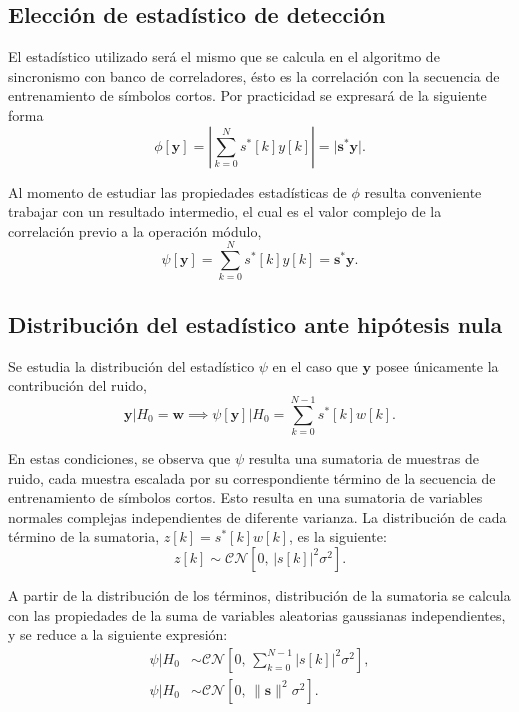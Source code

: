 \subsection{Elección de estadístico de detección}
\label{Ss:hipotesis-estadistico}


El estadístico utilizado será el mismo que se calcula en el algoritmo de sincronismo con banco de correladores, ésto es la correlación con la secuencia de entrenamiento de símbolos cortos. Por practicidad se expresará de la siguiente forma
\begin{equation}
    \phi[\mathbf{y}] = \left\lvert\sum_{k=0}^N s^\ast[k]y[k]\right\rvert = \lvert \mathbf{s}^\ast\mathbf{y}\rvert.
\end{equation}

Al momento de estudiar las propiedades estadísticas de $\phi$ resulta conveniente trabajar con un resultado intermedio, el cual es el valor complejo de la correlación previo a la operación módulo,
\begin{equation}
    \psi[\mathbf{y}] = \sum_{k=0}^N s^\ast[k]y[k] = \mathbf{s}^\ast\mathbf{y}.
\end{equation}

\subsection{Distribución del estadístico ante hipótesis nula}

Se estudia la distribución del estadístico $\psi$ en el caso que $\mathbf{y}$ posee únicamente la contribución del ruido,
\begin{equation}\label{eq:psi-ante-h0}
    \mathbf{y} | H_0 = \mathbf{w} \implies \psi[\mathbf{y}] | H_0= \sum_{k = 0}^{N-1} s^\ast[k]w[k].
\end{equation}

En estas condiciones, se observa que $\psi$ resulta una sumatoria de muestras de ruido, cada muestra escalada por su correspondiente término de la secuencia de entrenamiento de símbolos cortos. Esto resulta en una sumatoria de variables normales complejas independientes de diferente varianza. La distribución de cada término de la sumatoria, $z[k] = s^\ast[k]w[k]$, es la siguiente:
\begin{equation}
    z[k] \sim \mathcal{CN}[0,\, \lvert s[k]\rvert^2\sigma^2].
\end{equation}

A partir de la distribución de los términos, distribución de la sumatoria se calcula con las propiedades de la suma de variables aleatorias gaussianas independientes, y se reduce a la siguiente expresión:
\begin{equation}
    \begin{aligned}
        \psi | H_0 &\sim \mathcal{CN}\left[0,\, \sum_{k=0}^{N-1} \lvert s[k]\rvert^2  \sigma^2 \right],\\[0.5em]
        \psi | H_0 &\sim \mathcal{CN}\left[0,\,\lVert \mathbf{s}\rVert^2  \sigma^2 \right].
    \end{aligned}
\end{equation}

